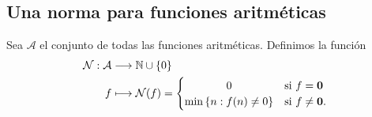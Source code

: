 \subsection{Una norma para funciones aritméticas}

\begin{definition}
Sea $\mathcal{A}$ el conjunto de todas las funciones aritméticas. Definimos la función
\begin{align*}
    \mathcal{N} : \mathcal{A} & \longrightarrow \mathbb{N} \cup \{0\} \\
	   f & \longmapsto \mathcal{N}(f)=
	   \begin{cases}
           \hfil 0 & \textnormal{si } f=\mathbf{0} \\ \hfil
           \min \left\{n : f(n)\neq 0\right\} & \textnormal{si } f \neq \mathbf{0}.
       \end{cases}
\end{align*}
\end{definition}

